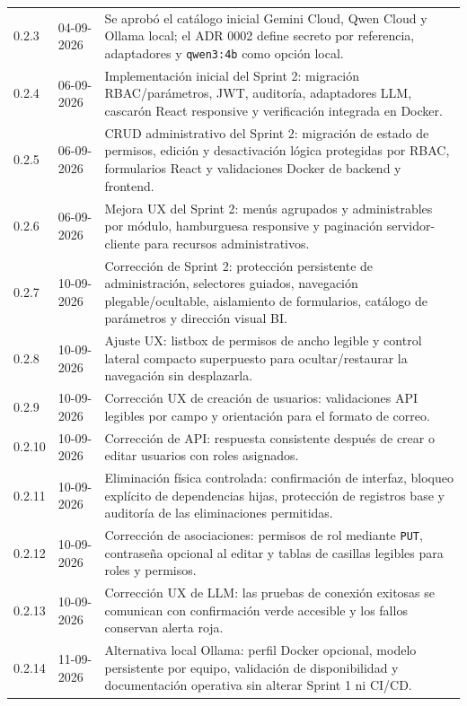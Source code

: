 \documentclass[11pt,letterpaper]{article}
\newcommand{\file}[1]{\texttt{#1}}
\begin{document}
\begin{longtable}{@{}p{0.82in}@{\hspace{0.16in}}p{0.98in}@{\hspace{0.16in}}p{4.36in}@{}}
  0.2.3 & 04-09-2026 & Se aprobó el catálogo inicial Gemini Cloud, Qwen Cloud y Ollama local; el ADR 0002 define secreto por referencia, adaptadores y \file{qwen3:4b} como opción local. \\
  0.2.4 & 06-09-2026 & Implementación inicial del Sprint 2: migración RBAC/parámetros, JWT, auditoría, adaptadores LLM, cascarón React responsive y verificación integrada en Docker. \\
  0.2.5 & 06-09-2026 & CRUD administrativo del Sprint 2: migración de estado de permisos, edición y desactivación lógica protegidas por RBAC, formularios React y validaciones Docker de backend y frontend. \\
  0.2.6 & 06-09-2026 & Mejora UX del Sprint 2: menús agrupados y administrables por módulo, hamburguesa responsive y paginación servidor-cliente para recursos administrativos. \\
  0.2.7 & 10-09-2026 & Corrección de Sprint 2: protección persistente de administración, selectores guiados, navegación plegable/ocultable, aislamiento de formularios, catálogo de parámetros y dirección visual BI. \\
  0.2.8 & 10-09-2026 & Ajuste UX: listbox de permisos de ancho legible y control lateral compacto superpuesto para ocultar/restaurar la navegación sin desplazarla. \\
  0.2.9 & 10-09-2026 & Corrección UX de creación de usuarios: validaciones API legibles por campo y orientación para el formato de correo. \\
  0.2.10 & 10-09-2026 & Corrección de API: respuesta consistente después de crear o editar usuarios con roles asignados. \\
  0.2.11 & 10-09-2026 & Eliminación física controlada: confirmación de interfaz, bloqueo explícito de dependencias hijas, protección de registros base y auditoría de las eliminaciones permitidas. \\
  0.2.12 & 10-09-2026 & Corrección de asociaciones: permisos de rol mediante \texttt{PUT}, contraseña opcional al editar y tablas de casillas legibles para roles y permisos. \\
  0.2.13 & 10-09-2026 & Corrección UX de LLM: las pruebas de conexión exitosas se comunican con confirmación verde accesible y los fallos conservan alerta roja. \\
  0.2.14 & 11-09-2026 & Alternativa local Ollama: perfil Docker opcional, modelo persistente por equipo, validación de disponibilidad y documentación operativa sin alterar Sprint 1 ni CI/CD. \\

\end{longtable}
\end{document}

